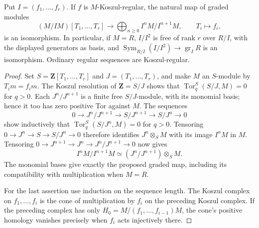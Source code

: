 \begin{theorem}\label{SA23-C-2}
Put $I=(f_1,\ldots,f_r)$.  If $f$ is $M$-Koszul-regular, the natural
map of graded modules
\[
 (M/IM)[T_1,\ldots,T_r]\longrightarrow
 \bigoplus_{n\ge0}I^nM/I^{n+1}M,\qquad T_i\longmapsto f_i,
\]
is an isomorphism.  In particular, if $M=R$, $I/I^2$ is free of rank
$r$ over $R/I$, with the displayed generators as basis, and
$\operatorname{Sym}_{R/I}(I/I^2)\to\operatorname{gr}_I R$ is an
isomorphism.  Ordinary regular sequences are Koszul-regular.
\end{theorem}
\begin{proof}
Set $S=\mathbf Z[T_1,\ldots,T_r]$ and $J=(T_1,\ldots,T_r)$, and
make $M$ an $S$-module by $T_i m=f_i m$.  The Koszul resolution of
$\mathbf Z=S/J$ shows that
$\operatorname{Tor}^S_q(S/J,M)=0$ for $q>0$.  Each $J^n/J^{n+1}$ is
a finite free $S/J$-module, with its monomial basis; hence it too has
zero positive Tor against $M$.  The sequences
\[
 0\to J^n/J^{n+1}\to S/J^{n+1}\to S/J^n\to0
\]
show inductively that $\operatorname{Tor}^S_q(S/J^n,M)=0$ for
$q>0$.  Tensoring $0\to J^n\to S\to S/J^n\to0$ therefore identifies
$J^n\otimes_S M$ with its image $I^nM$ in $M$.  Tensoring
$0\to J^{n+1}\to J^n\to J^n/J^{n+1}\to0$ now gives
\[
 I^nM/I^{n+1}M\simeq(J^n/J^{n+1})\otimes_S M.
\]
The monomial bases give exactly the proposed graded map, including
its compatibility with multiplication when $M=R$.

For the last assertion use induction on the sequence length.  The
Koszul complex on $f_1,\ldots,f_i$ is the cone of multiplication by
$f_i$ on the preceding Koszul complex.  If the preceding complex has
only $H_0=M/(f_1,\ldots,f_{i-1})M$, the cone's positive homology
vanishes precisely when $f_i$ acts injectively there.
\end{proof}

